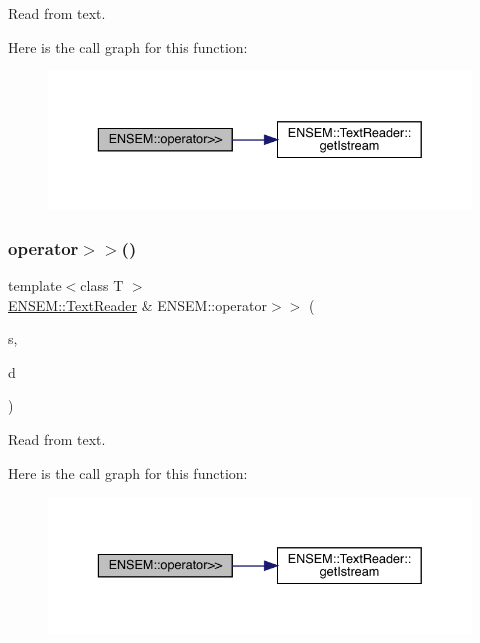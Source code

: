 Read from text. 

Here is the call graph for this function\+:\nopagebreak
\begin{figure}[H]
\begin{center}
\leavevmode
\includegraphics[width=336pt]{d2/d94/namespaceENSEM_a50e3d2025db65f9542e1c884553a842b_cgraph}
\end{center}
\end{figure}
\mbox{\label{namespaceENSEM_a14c9e48b1126ae8aad1c0ccc1b7e6e05}} 
\subsubsection{\texorpdfstring{operator$>$$>$()}{operator>>()}\hspace{0.1cm}{\footnotesize\ttfamily [3/7]}}
{\footnotesize\ttfamily template$<$class T $>$ \\
\mbox{\hyperlink{classENSEM_1_1TextReader}{E\+N\+S\+E\+M\+::\+Text\+Reader}} \& E\+N\+S\+E\+M\+::operator$>$$>$ (\begin{DoxyParamCaption}\item[{\mbox{\hyperlink{classENSEM_1_1TextReader}{E\+N\+S\+E\+M\+::\+Text\+Reader}} \&}]{s,  }\item[{\mbox{\hyperlink{classENSEM_1_1EScalar}{E\+Scalar}}$<$ \mbox{\hyperlink{classENSEM_1_1OVector}{O\+Vector}}$<$ T $>$ $>$ \&}]{d }\end{DoxyParamCaption})\hspace{0.3cm}{\ttfamily [inline]}}



Read from text. 

Here is the call graph for this function\+:\nopagebreak
\begin{figure}[H]
\begin{center}
\leavevmode
\includegraphics[width=336pt]{d2/d94/namespaceENSEM_a14c9e48b1126ae8aad1c0ccc1b7e6e05_cgraph}
\end{center}
\end{figure}
\mbox{\label{namespaceENSEM_a09c1f3286f4513b7ecefb96943278df6}} 

